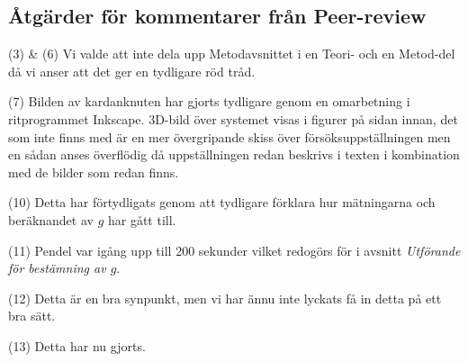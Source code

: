 \subsection{Åtgärder för kommentarer från Peer-review}

\noindent (3) \& (6) Vi valde att inte dela upp Metodavsnittet i en Teori- och en Metod-del då vi anser att det ger en tydligare röd tråd.
\newline

\noindent (7) Bilden av kardanknuten har gjorts tydligare genom en omarbetning i ritprogrammet Inkscape. 3D-bild över systemet visas i figurer på sidan innan, det som inte finns med är en mer övergripande skiss över försöksuppställningen men en sådan anses överflödig då uppställningen redan beskrivs i texten i kombination med de bilder som redan finns.
\newline 

\noindent (10) Detta har förtydligats genom att tydligare förklara hur mätningarna och beräknandet av $g$ har gått till.
\newline

\noindent (11) Pendel var igång upp till 200 sekunder vilket redogörs för i avsnitt \textit{Utförande för bestämning av $g$}.
\newline

\noindent (12) Detta är en bra synpunkt, men vi har ännu inte lyckats få in detta på ett bra sätt.
\newline 

\noindent (13) Detta har nu gjorts.


%